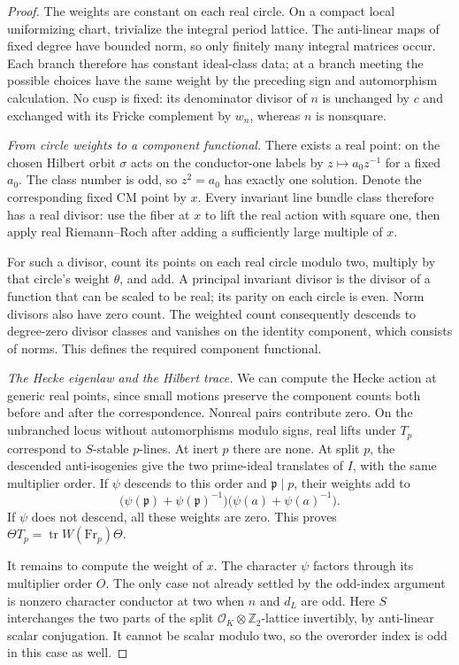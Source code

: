 \begin{proof}
The weights are constant on each real circle. On a compact local
uniformizing chart, trivialize the integral period lattice. The
anti-linear maps of fixed degree have bounded norm, so only finitely
many integral matrices occur. Each branch therefore has constant
ideal-class data; at a branch meeting the possible choices have the
same weight by the preceding sign and automorphism calculation.
No cusp is fixed: its denominator divisor of \(n\) is unchanged
by \(c\) and exchanged with its Fricke complement by \(w_n\),
whereas \(n\) is nonsquare.

\emph{From circle weights to a component functional.}
There exists a real point: on the chosen Hilbert orbit \(\sigma\)
acts on the conductor-one labels by \(z\mapsto a_0z^{-1}\) for a
fixed \(a_0\). The class number is odd, so \(z^2=a_0\) has exactly
one solution. Denote the corresponding fixed CM point by \(x\).
Every invariant line bundle class therefore has a real divisor:
use the fiber at \(x\) to lift the real action with square one,
then apply real Riemann--Roch after adding a sufficiently large
multiple of \(x\).

For such a divisor, count its points on each real circle modulo two,
multiply by that circle's weight \(\theta\), and add. A principal
invariant divisor is the divisor of a function that can be scaled to
be real; its parity on each circle is even. Norm divisors also have
zero count. The weighted count consequently descends to degree-zero
divisor classes and vanishes on the identity component, which
consists of norms. This defines the required component functional.

\emph{The Hecke eigenlaw and the Hilbert trace.}
We can compute the Hecke action at generic real points, since small
motions preserve the component counts both before and after the
correspondence. Nonreal pairs contribute zero. On the unbranched
locus without automorphisms modulo signs, real lifts under \(T_p\)
correspond to \(S\)-stable \(p\)-lines. At inert \(p\) there are
none. At split \(p\), the descended anti-isogenies give the two
prime-ideal translates of \(I\), with the same multiplier order.
If \(\psi\) descends to this order and \(\mathfrak p\mid p\),
their weights add to
\[
 \bigl(\psi(\mathfrak p)+\psi(\mathfrak p)^{-1}\bigr)
 \bigl(\psi(a)+\psi(a)^{-1}\bigr).
\]
If \(\psi\) does not descend, all these weights are zero. This
proves \(\Theta T_p=\operatorname{tr}W(\mathrm{Fr}_p)\Theta\).

It remains to compute the weight of \(x\). The character \(\psi\)
factors through its multiplier order \(O\). The only case not
already settled by the odd-index argument is nonzero character
conductor at two when \(n\) and \(d_L\) are odd. Here \(S\)
interchanges the two parts of the split
\(\mathcal O_K\otimes\mathbb Z_2\)-lattice invertibly, by
anti-linear scalar conjugation. It cannot be scalar modulo two,
so the overorder index is odd in this case as well.


\end{proof}
